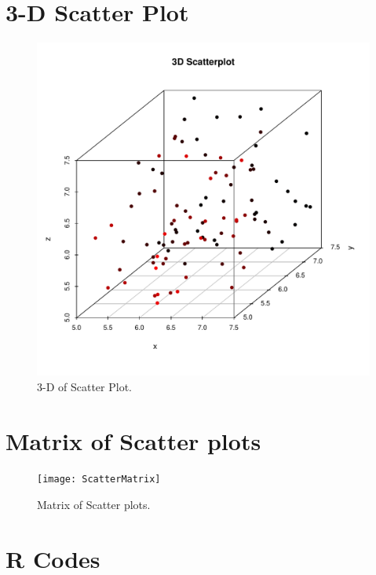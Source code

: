 \documentclass[11pt]{amsart}
\begin{document}
\newpage

 \section*{\bf{3-D Scatter Plot }}
 \begin{figure}[H]
\centering
 \includegraphics[scale=0.7]{scatter3D}%
  \caption{3-D of Scatter Plot. }
\label{fig:ScatterMat}
\end{figure} 
\newpage

\section*{\bf{Matrix of Scatter plots}}

\begin{figure}[H]
\centering
 \texttt{[image: ScatterMatrix]}%
  \caption{Matrix of Scatter plots. }
\label{fig:ScatterMat}
\end{figure} 

\appendix

\section{R Codes \label{Rcodes}}
 



\end{document}
